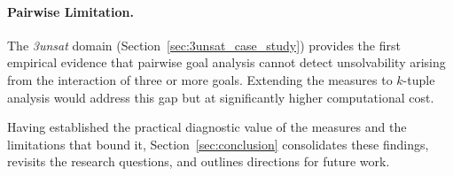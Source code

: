 \paragraph{Pairwise Limitation.} The \textit{3unsat} domain (Section~\ref{sec:3unsat_case_study}) provides the first empirical evidence that pairwise goal analysis cannot detect unsolvability arising from the interaction of three or more goals. Extending the measures to $k$-tuple analysis would address this gap but at significantly higher computational cost.

Having established the practical diagnostic value of the measures and the limitations that bound it, Section~\ref{sec:conclusion} consolidates these findings, revisits the research questions, and outlines directions for future work.
